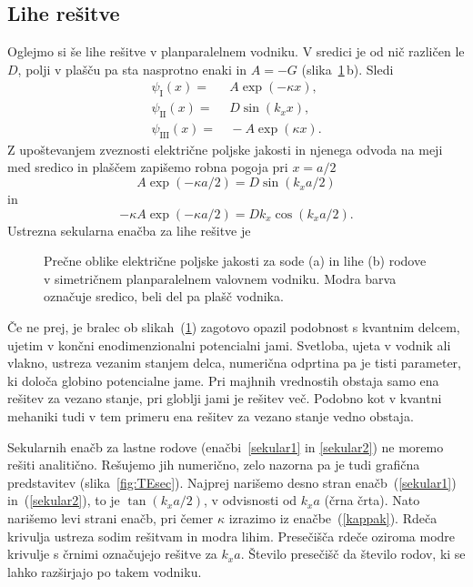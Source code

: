 \subsection*{Lihe rešitve}
Oglejmo si še lihe rešitve v planparalelnem vodniku. V sredici je od nič različen
le $D$, polji v plašču pa sta nasprotno enaki in $A = -G$ (slika~\ref{fig:TESodi}\,b). Sledi
\begin{align}
\psi_{\mathrm{I}}(x) =&~ A \exp(-\kappa x),\\
\psi_{\mathrm{II}}(x) =&~ D \sin(k_x x),\\
\psi_{\mathrm{III}}(x) =&~ -A \exp(\kappa x).
\end{align}
Z upoštevanjem zveznosti električne poljske jakosti in njenega odvoda na 
meji med sredico in plaščem zapišemo robna pogoja pri $x=a/2$
\begin{equation}
A \exp(-\kappa a/2) = D \sin(k_x a/2)
\end{equation}
in 
\begin{equation}
-\kappa A \exp(-\kappa a/2) = D k_x \cos(k_x a/2).
\end{equation}
Ustrezna sekularna enačba za lihe rešitve je
\begin{figure}[h]
\centering
\def\svgwidth{140truemm} 
 
\caption{Prečne oblike električne poljske jakosti za sode (a) in lihe (b) rodove v 
simetričnem planparalelnem valovnem vodniku. Modra barva označuje sredico, beli del 
pa plašč vodnika. 
}
\label{fig:TESodi}
\end{figure}

\begin{remark}
Če ne prej, je bralec ob slikah~(\ref{fig:TESodi}) zagotovo opazil podobnost s kvantnim 
delcem, ujetim v končni enodimenzionalni potencialni jami. Svetloba, ujeta v vodnik ali
vlakno, ustreza vezanim stanjem delca, numerična odprtina pa je tisti parameter, 
ki določa globino potencialne jame. Pri majhnih vrednostih obstaja samo ena rešitev 
za vezano stanje, pri globlji jami je rešitev več. Podobno kot v kvantni mehaniki
tudi v tem primeru ena rešitev za vezano stanje vedno obstaja. 
\end{remark}

Sekularnih enačb za lastne rodove (enačbi~\ref{sekular1} in \ref{sekular2}) ne moremo rešiti 
analitično. Rešujemo jih numerično, zelo nazorna pa je tudi grafična predstavitev
(slika~\ref{fig:TEsec}). Najprej narišemo desno stran enačb~(\ref{sekular1}) 
in~(\ref{sekular2}), to je $\tan (k_x a/2)$, v odvisnosti
od $k_xa$ (črna črta). Nato narišemo levi strani enačb, pri čemer $\kappa$ izrazimo iz enačbe~(\ref{kappak}). Rdeča krivulja ustreza sodim rešitvam in modra lihim. 
Presečišča rdeče oziroma modre krivulje s črnimi
označujejo rešitve za $k_xa$. Število presečišč da število rodov, ki se lahko razširjajo po takem vodniku. 

